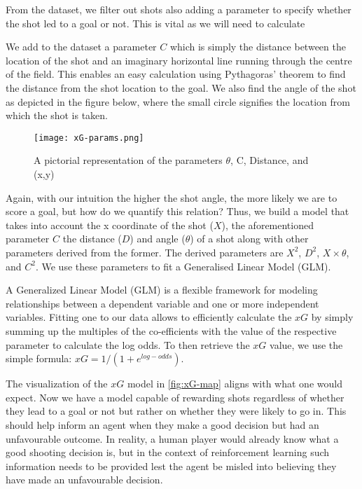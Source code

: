 \documentclass[11pt]{article}
\begin{document}
From the dataset, we filter out shots also adding a parameter to specify whether the shot led to a goal or not. This is vital as we will need to calculate 

We add to the dataset a parameter $C$ which is simply the distance between the location of the shot and an imaginary horizontal line running through the centre of the field. This enables an easy calculation using Pythagoras' theorem to find the distance from the shot location to the goal. We also find the angle of the shot as depicted in the figure below, where the small circle signifies the location from which the shot is taken.

\begin{figure}[!h]
    \centering
    \texttt{[image: xG-params.png]}
    \caption{A pictorial representation of the parameters $\theta$, C, Distance, and (x,y)}
    \label{fig:xG-params}
\end{figure}

Again, with our intuition the higher the shot angle, the more likely we are to score a goal, but how do we quantify this relation?
Thus, we build a model that takes into account the x coordinate of the shot ($X$), the aforementioned parameter $C$ the distance ($D$) and angle ($\theta$) of a shot along with other parameters derived from the former.
The derived parameters are $X^2$, $D^2$, $X \times \theta$, and $C^2$. We use these parameters to fit a Generalised Linear Model (GLM). 

A Generalized Linear Model (GLM) is a flexible framework for modeling relationships between a dependent variable and one or more independent variables. Fitting one to our data allows to efficiently calculate the $xG$ by simply summing up the multiples of the co-efficients with the value of the respective parameter to calculate the log odds. To then retrieve the $xG$ value, we use the simple formula: $xG = 1/(1+e^{log-odds})$.

The visualization of the $xG$ model in \ref{fig:xG-map} aligns with what one would expect. Now we have a model capable of rewarding shots regardless of whether they lead to a goal or not but rather on whether they were likely to go in. This should help inform an agent when they make a good decision but had an unfavourable outcome. In reality, a human player would already know what a good shooting decision is, but in the context of reinforcement learning such information needs to be provided lest the agent be misled into believing they have made an unfavourable decision.
\end{document}
